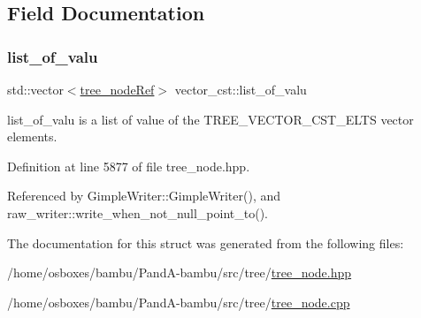 \subsection{Field Documentation}
\mbox{\label{structvector__cst_a841a74bdf5cfa9227a30dc1f6b6dfe7e}} 
\subsubsection{\texorpdfstring{list\+\_\+of\+\_\+valu}{list\_of\_valu}}
{\footnotesize\ttfamily std\+::vector$<$\hyperlink{tree__node_8hpp_a6ee377554d1c4871ad66a337eaa67fd5}{tree\+\_\+node\+Ref}$>$ vector\+\_\+cst\+::list\+\_\+of\+\_\+valu}



list\+\_\+of\+\_\+valu is a list of value of the T\+R\+E\+E\+\_\+\+V\+E\+C\+T\+O\+R\+\_\+\+C\+S\+T\+\_\+\+E\+L\+TS vector elements. 



Definition at line 5877 of file tree\+\_\+node.\+hpp.



Referenced by Gimple\+Writer\+::\+Gimple\+Writer(), and raw\+\_\+writer\+::write\+\_\+when\+\_\+not\+\_\+null\+\_\+point\+\_\+to().



The documentation for this struct was generated from the following files\+:\begin{DoxyCompactItemize}
\item 
/home/osboxes/bambu/\+Pand\+A-\/bambu/src/tree/\hyperlink{tree__node_8hpp}{tree\+\_\+node.\+hpp}\item 
/home/osboxes/bambu/\+Pand\+A-\/bambu/src/tree/\hyperlink{tree__node_8cpp}{tree\+\_\+node.\+cpp}\end{DoxyCompactItemize}
